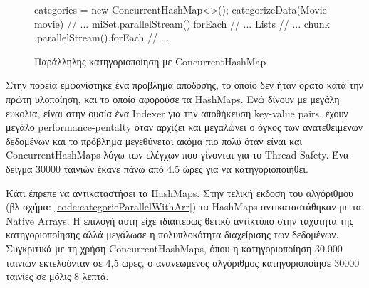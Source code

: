 \begin{figure}[h]
    \begin{javacode}
    categories = new ConcurrentHashMap<>();
    categorizeData(Movie movie) { // ...
        miSet.parallelStream().forEach // ...
    }
    Lists
      // ...
         chunk
            .parallelStream().forEach // ...
      
    \end{javacode}
    \caption{Παράλληλης κατηγοριοποίηση με ConcurrentHashMap}
   \label{code:categorieParallelWithCHM}
\end{figure}

Στην πορεία εμφανίστηκε ένα πρόβλημα απόδοσης, το οποίο δεν ήταν ορατό κατά την πρώτη υλοποίηση, και το οποίο αφορούσε τα HashMaps.
Ενώ δίνουν με μεγάλη ευκολία, είναι στην ουσία ένα Indexer για την αποθήκευση key-value pairs, έχουν μεγάλο performance-pentalty όταν αρχίζει και μεγαλώνει ο όγκος των ανατεθειμένων δεδομένων και το πρόβλημα μεγεθύνεται ακόμα πιο πολύ όταν είναι και ConcurrentHashMaps λόγω των ελέγχων που γίνονται για το Thread Safety. Ένα δείγμα 30000 ταινιών έκανε πάνω από 4.5 ώρες για να κατηγοριοποιήθει.

Κάτι έπρεπε να αντικαταστήσει τα HashMaps. Στην τελική έκδοση του αλγόριθμου (βλ σχήμα: \ref{code:categorieParallelWithArr}) τα HashMaps αντικαταστάθηκαν με τα Native Arrays. Η επιλογή αυτή είχε ιδιαιτέρως θετικό αντίκτυπο στην ταχύτητα της κατηγοριοποίησης αλλά μεγάλωσε η πολυπλοκότητα διαχείρισης των δεδομένων.
Συγκριτικά με τη χρήση ConcurrentHashMaps, όπου η κατηγοριοποίηση 30.000 ταινιών εκτελούνταν σε 4,5 ώρες, ο ανανεωμένος αλγόριθμος κατηγοριοποίησε 30000 ταινίες σε μόλις 8 λεπτά. 

